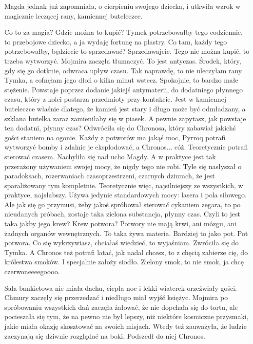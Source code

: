 Magda jednak już zapomniała, o cierpieniu swojego dziecka, i utkwiła wzrok w magicznie leczącej rany, kamiennej buteleczce.

\begin{dialogue}
\ds{} Co to za magia? Gdzie można to kupić? Tymek potrzebowałby tego codziennie, to przebojowe dziecko, a ja wydaję fortunę na plastry.
Co tam, każdy tego potrzebowałby, będziecie to sprzedawać? Sprzedawajcie.
\ds{} Tego nie można kupić, to trzeba wytworzyć. \dm{} Mojmira zaczęła tłumaczyć. \dm{} To jest antyczas. Środek, który, gdy się go dotknie, odwraca upływ czasu. 
Tak naprawdę, to nie uleczyłam rany Tymka, a cofnęłam jego dłoń o kilka minut wstecz. Spokojnie, to bardzo małe stężenie.
Powstaje poprzez dodanie jakiejś antymaterii, do dodatniego płynnego czasu, który z kolei postarza przedmioty przy kontakcie. 
Jest w kamiennej buteleczce właśnie dlatego, że kamień jest stary i długo może być odmładzany, a szklana butelka zaraz zamieniłaby się w piasek.
A pewnie zapytasz, jak powstaje ten dodatni, płynny czas? 
\dm{} Odwróciła się do Chronosa, który zabawiał jakichś gości staniem na ogonie. \dm{} 
Każdy z potworów ma jakąś moc, Pyrroq potrafi wytworzyć bomby i zdalnie je eksplodować, a Chronos... cóż. Teoretycznie potrafi sterować czasem.
\dm{} Nachyliła się nad ucho Magdy. \dm{} A w praktyce jest tak przerażony używaniem swojej mocy, że nigdy tego nie robi.
Tyle się nasłyszał o paradoksach, rozerwaniach czasoprzestrzeni, czarnych dziurach, że jest sparaliżowany tym kompletnie.
Teoretycznie więc, najsilniejszy ze wszystkich, w praktyce, najsłabszy.
Używa jedynie standardowych mocy: lasera i pola siłowego.
Ale jak się go przymusi, żeby jakoś spróbował sterować cykaniem zegara, to po nieudanych próbach, zostaje taka zielona substancja, płynny czas.
\ds{} Czyli to jest taka jakby jego krew? Krew potwora?
\ds{} Potwory nie mają krwi, ani mózgu, ani żadnych organów wewnętrznych. To taka żywa materia. 
Bardziej to jako pot. Pot potwora. Co się wykrzywiasz, chciałaś wiedzieć, to wyjaśniam. \dm{} Zwróciła się do Tymka. \dm{}
A Chronos też potrafi latać, jak nadal chcesz, to z chęcią zabierze cię, do królestwa smoków. I specjalnie założy siodło.
\ds{} Zielony smok, to nie smok, ja chcę czerwoneeeegoooo.
\end{dialogue}

\divider{}

Sala bankietowa nie miała dachu, ciepła noc i lekki wiaterek orzeźwiały gości.
Chmury zaczęły się przerzedzać i niedługo miał wyjść księżyc.
Mojmira po spróbowaniu wszystkich dań zaczęła żałować, że nie dopchała się do tortu, ale pocieszała się tym, 
że na pewno nie był lepszy, niż niektóre kosmiczne przysmaki, jakie miała okazję skosztować na swoich misjach.
Wtedy też zauważyła, że ludzie zaczynają się dziwnie rozglądać na boki. 
Podszedł do niej Chronos.

